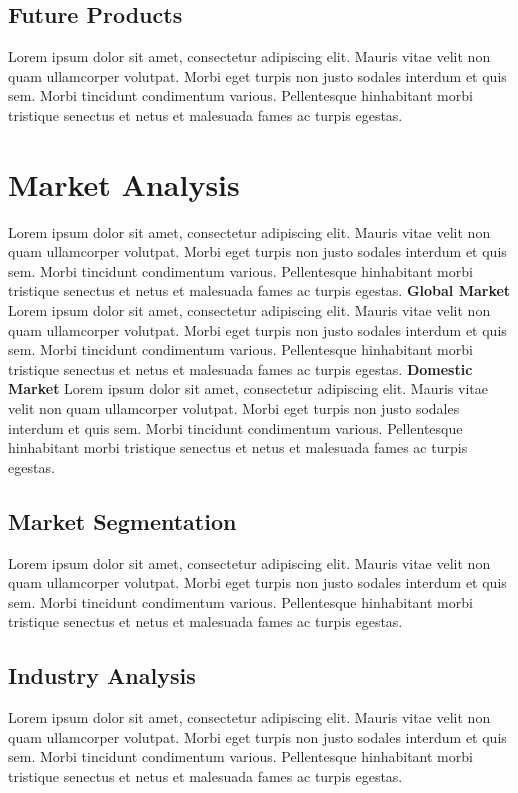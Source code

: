 \documentclass[11pt]{article}
\begin{document}
\subsection{Future Products}
Lorem ipsum dolor sit amet, consectetur adipiscing elit. Mauris vitae velit
non quam ullamcorper volutpat. Morbi eget turpis non justo sodales interdum
et quis sem. Morbi tincidunt condimentum various. Pellentesque hinhabitant morbi
tristique senectus et netus et malesuada fames ac turpis egestas.\newline
\pagebreak

\section{Market Analysis}
Lorem ipsum dolor sit amet, consectetur adipiscing elit. Mauris vitae velit
non quam ullamcorper volutpat. Morbi eget turpis non justo sodales interdum
et quis sem. Morbi tincidunt condimentum various. Pellentesque hinhabitant morbi
tristique senectus et netus et malesuada fames ac turpis egestas.\newline
\textbf{Global Market}\newline
Lorem ipsum dolor sit amet, consectetur adipiscing elit. Mauris vitae velit
non quam ullamcorper volutpat. Morbi eget turpis non justo sodales interdum
et quis sem. Morbi tincidunt condimentum various. Pellentesque hinhabitant morbi
tristique senectus et netus et malesuada fames ac turpis egestas.\newline
\textbf{Domestic Market}\newline
Lorem ipsum dolor sit amet, consectetur adipiscing elit. Mauris vitae velit
non quam ullamcorper volutpat. Morbi eget turpis non justo sodales interdum
et quis sem. Morbi tincidunt condimentum various. Pellentesque hinhabitant morbi
tristique senectus et netus et malesuada fames ac turpis egestas.\newline
\subsection{Market Segmentation}
Lorem ipsum dolor sit amet, consectetur adipiscing elit. Mauris vitae velit
non quam ullamcorper volutpat. Morbi eget turpis non justo sodales interdum
et quis sem. Morbi tincidunt condimentum various. Pellentesque hinhabitant morbi
tristique senectus et netus et malesuada fames ac turpis egestas.\newline
\subsection{Industry Analysis}
Lorem ipsum dolor sit amet, consectetur adipiscing elit. Mauris vitae velit
non quam ullamcorper volutpat. Morbi eget turpis non justo sodales interdum
et quis sem. Morbi tincidunt condimentum various. Pellentesque hinhabitant morbi
tristique senectus et netus et malesuada fames ac turpis egestas.\newline
\hypertarget{competition_and_buying_patterns}{}
\end{document}
